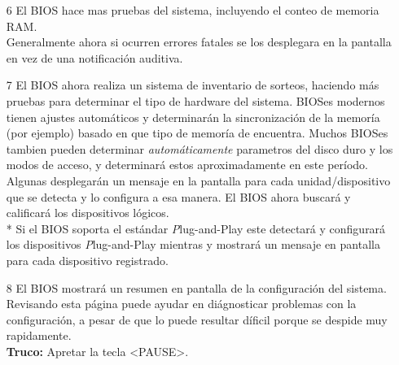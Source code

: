 \documentclass[12pt,oneside,a4paper]{article}
\begin{document}
\begin{enumerate}
	\item[6] El BIOS hace mas pruebas del sistema, incluyendo el conteo de memoria
		RAM. \\
		Generalmente ahora si ocurren errores fatales se los desplegara en la
		pantalla en vez de una notificación auditiva.


	\item[7] El BIOS ahora realiza un sistema de inventario de sorteos, haciendo
		más pruebas para determinar el tipo de hardware del sistema.
		BIOSes modernos tienen ajustes automáticos y determinarán la sincronización
		de la memoría (por ejemplo) basado en que tipo de memoría de encuentra.
		Muchos BIOSes tambien pueden determinar {\em automáticamente} parametros
		del disco duro y los modos de acceso, y determinará estos aproximadamente
		en este período.
		Algunas desplegarán un mensaje en la pantalla para cada unidad/dispositivo que
		se detecta y lo configura a esa manera. El BIOS ahora buscará y calificará los
		dispositivos lógicos. \\*
		Si el BIOS soporta el estándar {\emph Plug-and-Play }\cite{plugandplay} este detectará
		y configurará los dispositivos {\emph Plug-and-Play} mientras y mostrará un mensaje
		en pantalla para cada dispositivo registrado.
	

	\item[8] El BIOS mostrará un resumen en pantalla de la configuración del sistema.  Revisando
		esta página puede ayudar en diágnosticar problemas con la configuración, a
		pesar de que lo puede resultar díficil porque se despide muy rapidamente. \\
		{\bf Truco:} Apretar la tecla <PAUSE>.


\end{enumerate}
\end{document}
